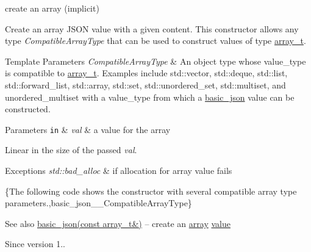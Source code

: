 create an array (implicit) 

Create an array J\+S\+ON value with a given content. This constructor allows any type {\itshape Compatible\+Array\+Type} that can be used to construct values of type \hyperlink{a00025_ab00b882d39306d663c23dab110f5cae0}{array\+\_\+t}.


\begin{DoxyTemplParams}{Template Parameters}
{\em Compatible\+Array\+Type} & An object type whose {\ttfamily value\+\_\+type} is compatible to \hyperlink{a00025_ab00b882d39306d663c23dab110f5cae0}{array\+\_\+t}. Examples include {\ttfamily std\+::vector}, {\ttfamily std\+::deque}, {\ttfamily std\+::list}, {\ttfamily std\+::forward\+\_\+list}, {\ttfamily std\+::array}, {\ttfamily std\+::set}, {\ttfamily std\+::unordered\+\_\+set}, {\ttfamily std\+::multiset}, and {\ttfamily unordered\+\_\+multiset} with a {\ttfamily value\+\_\+type} from which a \hyperlink{a00025}{basic\+\_\+json} value can be constructed.\\
\hline
\end{DoxyTemplParams}

\begin{DoxyParams}[1]{Parameters}
\mbox{\tt in}  & {\em val} & a value for the array\\
\hline
\end{DoxyParams}
Linear in the size of the passed {\itshape val}.


\begin{DoxyExceptions}{Exceptions}
{\em std\+::bad\+\_\+alloc} & if allocation for array value fails\\
\hline
\end{DoxyExceptions}
\{The following code shows the constructor with several compatible array type parameters.,basic\+\_\+json\+\_\+\+\_\+\+Compatible\+Array\+Type\}

\begin{DoxySeeAlso}{See also}
\hyperlink{a00025_a3aaf41d385f0d9a93deb92f9b14ae0cf}{basic\+\_\+json(const array\+\_\+t\&)} -- create an \hyperlink{a00025_a5685815624b086caa532f41e853d4b0f}{array} \hyperlink{a00025_a0a2cbbd95862a623e7dc5c37e67dead0}{value}
\end{DoxySeeAlso}
\begin{DoxySince}{Since}
version 1.. 
\end{DoxySince}
